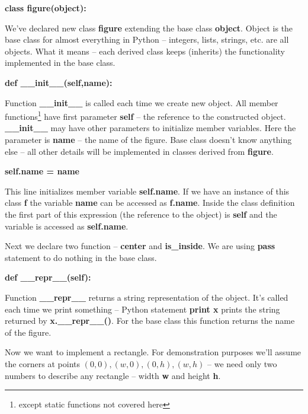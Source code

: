 \textbf{class figure(object):}

We've declared new class \textbf{figure} extending the base class
\textbf{object}. Object is the base class for almost everything in Python
 -- integers, lists, strings, etc. are all objects. What it means --
each derived class keeps (inherits) the functionality implemented
in the base class.

\textbf{ def \_\_init\_\_(self,name):}

Function \textbf{\_\_init\_\_} is called each time we create new object.
All member functions\footnote{except static functions not covered here} have
first parameter \textbf{self} -- the reference to the constructed object.
\textbf{\_\_init\_\_} may have other parameters to initialize member variables.
Here the parameter is \textbf{name} -- the name of the figure. Base class
doesn't know anything else -- all other details will be implemented in
classes derived from \textbf{figure}.

\textbf{self.name = name}

This line initializes member variable \textbf{self.name}. If we have an
instance of this class \textbf{f} the variable \textbf{name} can be
accessed as \textbf{f.name}.
Inside the class definition the first
part of this expression (the reference to the object) is \textbf{self}
and the variable is accessed as \textbf{self.name}.

Next we declare two function -- \textbf{center} and \textbf{is\_inside}.
We are using \textbf{pass} statement
to do nothing in the base class.

\textbf{def \_\_repr\_\_(self):}

Function \textbf{\_\_repr\_\_} returns a string representation of the
object. It's called each time we print something -- Python statement
\textbf{print x} prints the string returned by \textbf{x.\_\_repr\_\_()}.
For the base class this function returns the name of the figure.


Now we want to implement a rectangle. For demonstration purposes
we'll assume the corners at points $(0,0), (w,0), (0,h), (w,h)$ --
we need only two numbers to describe any rectangle -- width \textbf{w}
and height \textbf{h}.

